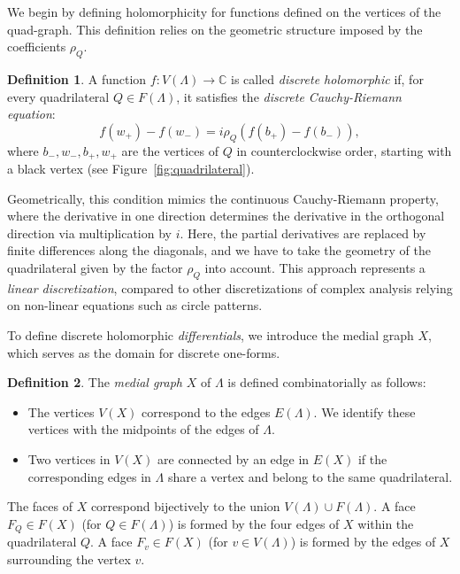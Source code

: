 \documentclass[11pt,a4paper]{article}
\theoremstyle{definition}
\newtheorem*{definition}{Definition}
\begin{document}
We begin by defining holomorphicity for functions defined on the vertices of the quad-graph. This definition relies on the geometric structure imposed by the coefficients $\rho_Q$.

\begin{definition}
	A function $f: V(\Lambda) \to \mathds{C}$ is called \textit{discrete holomorphic} if, for every quadrilateral $Q \in F(\Lambda)$, it satisfies the \textit{discrete Cauchy-Riemann equation}:
	\[ f(w_+) - f(w_-) = i \rho_Q (f(b_+) - f(b_-)), \]
	where $b_-, w_-, b_+, w_+$ are the vertices of $Q$ in counterclockwise order, starting with a black vertex (see Figure~\ref{fig:quadrilateral}).
\end{definition}

Geometrically, this condition mimics the continuous Cauchy-Riemann property, where the derivative in one direction determines the derivative in the orthogonal direction via multiplication by $i$. Here, the partial derivatives are replaced by finite differences along the diagonals, and we have to take the geometry of the quadrilateral given by the factor $\rho_Q$ into account. This approach represents a \textit{linear discretization}, compared to other discretizations of complex analysis relying on non-linear equations such as circle patterns.

To define discrete holomorphic \textit{differentials}, we introduce the medial graph $X$, which serves as the domain for discrete one-forms.

\begin{definition}
	The \textit{medial graph} $X$ of $\Lambda$ is defined combinatorially as follows:
	\begin{itemize}
		\item The vertices $V(X)$ correspond to the edges $E(\Lambda)$. We identify these vertices with the midpoints of the edges of $\Lambda$.
		\item Two vertices in $V(X)$ are connected by an edge in $E(X)$ if the corresponding edges in $\Lambda$ share a vertex and belong to the same quadrilateral.
	\end{itemize}
\end{definition}

The faces of $X$ correspond bijectively to the union $V(\Lambda) \cup F(\Lambda)$. A face $F_Q \in F(X)$ (for $Q \in F(\Lambda)$) is formed by the four edges of $X$ within the quadrilateral $Q$. A face $F_v \in F(X)$ (for $v \in V(\Lambda)$) is formed by the edges of $X$ surrounding the vertex $v$.
\end{document}
